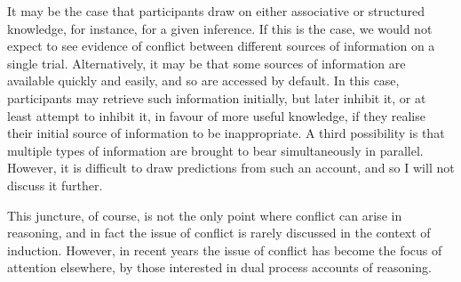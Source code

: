 It may be the case that participants draw
on either associative or structured knowledge, for instance, for a given inference.
If this is the case, we would not expect to see
evidence of conflict between different sources of information on a single trial.
Alternatively,
it may be that some sources of information
are available quickly and easily, and so are accessed by default.
In this case, participants may
retrieve such information initially,
but later inhibit it, or at least attempt to inhibit it,
in favour of more useful knowledge,
if they realise their initial source of information
to be inappropriate.
A third possibility is that multiple types of information
are brought to bear simultaneously in parallel.
However, it is difficult to draw predictions from such an account,
and so I will not discuss it further.

This juncture, of course, is not the only point
where conflict can arise in reasoning,
and in fact the issue of conflict is rarely discussed
in the context of induction.
However, in recent years the issue of conflict
has become the focus of attention elsewhere,
by those interested in dual process accounts of reasoning.












